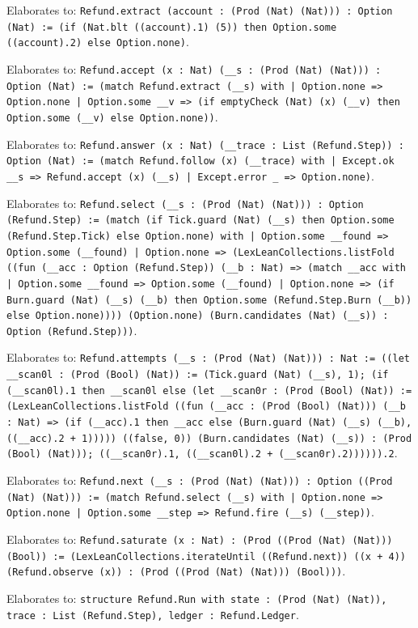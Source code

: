 \documentclass[11pt]{article}
\begin{document}
\noindent Elaborates to: \texttt{Refund.extract (account : (Prod (Nat) (Nat))) : Option (Nat) := (if (Nat.blt ((account).1) (5)) then Option.some ((account).2) else Option.none)}.\par
\noindent Elaborates to: \texttt{Refund.accept (x : Nat) (\_\_s : (Prod (Nat) (Nat))) : Option (Nat) := (match Refund.extract (\_\_s) with | Option.none => Option.none | Option.some \_\_v => (if emptyCheck (Nat) (x) (\_\_v) then Option.some (\_\_v) else Option.none))}.\par
\noindent Elaborates to: \texttt{Refund.answer (x : Nat) (\_\_trace : List (Refund.Step)) : Option (Nat) := (match Refund.follow (x) (\_\_trace) with | Except.ok \_\_s => Refund.accept (x) (\_\_s) | Except.error \_ => Option.none)}.\par
\noindent Elaborates to: \texttt{Refund.select (\_\_s : (Prod (Nat) (Nat))) : Option (Refund.Step) := (match (if Tick.guard (Nat) (\_\_s) then Option.some (Refund.Step.Tick) else Option.none) with | Option.some \_\_found => Option.some (\_\_found) | Option.none => (LexLeanCollections.listFold ((fun (\_\_acc : Option (Refund.Step)) (\_\_b : Nat) => (match \_\_acc with | Option.some \_\_found => Option.some (\_\_found) | Option.none => (if Burn.guard (Nat) (\_\_s) (\_\_b) then Option.some (Refund.Step.Burn (\_\_b)) else Option.none)))) (Option.none) (Burn.candidates (Nat) (\_\_s)) : Option (Refund.Step)))}.\par
\noindent Elaborates to: \texttt{Refund.attempts (\_\_s : (Prod (Nat) (Nat))) : Nat := ((let \_\_scan0l : (Prod (Bool) (Nat)) := (Tick.guard (Nat) (\_\_s), 1); (if (\_\_scan0l).1 then \_\_scan0l else (let \_\_scan0r : (Prod (Bool) (Nat)) := (LexLeanCollections.listFold ((fun (\_\_acc : (Prod (Bool) (Nat))) (\_\_b : Nat) => (if (\_\_acc).1 then \_\_acc else (Burn.guard (Nat) (\_\_s) (\_\_b), ((\_\_acc).2 + 1))))) ((false, 0)) (Burn.candidates (Nat) (\_\_s)) : (Prod (Bool) (Nat))); ((\_\_scan0r).1, ((\_\_scan0l).2 + (\_\_scan0r).2)))))).2}.\par
\noindent Elaborates to: \texttt{Refund.next (\_\_s : (Prod (Nat) (Nat))) : Option ((Prod (Nat) (Nat))) := (match Refund.select (\_\_s) with | Option.none => Option.none | Option.some \_\_step => Refund.fire (\_\_s) (\_\_step))}.\par
\noindent Elaborates to: \texttt{Refund.saturate (x : Nat) : (Prod ((Prod (Nat) (Nat))) (Bool)) := (LexLeanCollections.iterateUntil ((Refund.next)) ((x + 4)) (Refund.observe (x)) : (Prod ((Prod (Nat) (Nat))) (Bool)))}.\par
\noindent Elaborates to: \texttt{structure Refund.Run with state : (Prod (Nat) (Nat)), trace : List (Refund.Step), ledger : Refund.Ledger}.\par
\end{document}
